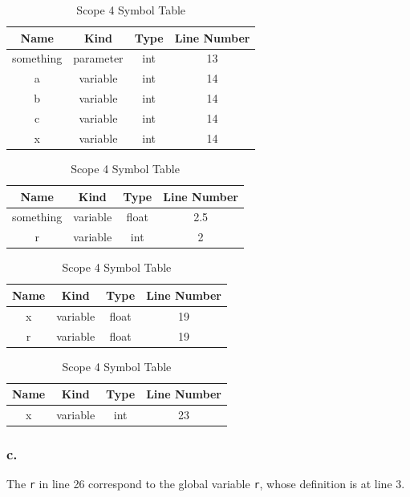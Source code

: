 \documentclass{article}
\def\code#1{\texttt{#1}}
\begin{document}
    \begin{table}[h!]
		\begin{center}
			\caption{Scope 1 Symbol Table}
			\label{tab:table1}
			\begin{tabular}{ |c|c|c|c|} 
			\toprule
			Name & Kind & Type & Line Number  \\ 
			\midrule
			something & parameter & int & 13  \\ 

			a & variable & int & 14  \\ 

			b & variable & int & 14  \\ 

			c & variable & int & 14  \\ 

			x & variable & int & 14  \\ 
			\bottomrule
			\end{tabular}
		
			\caption{Scope 2 Symbol Table}
			\label{tab:table 2}
			\begin{tabular}{ |c|c|c|c|} 
				\toprule
				Name & Kind & Type & Line Number  \\ 
				\midrule
				something & variable & float & 2.5 \\ 
				r & variable & int & 2  \\ 
				\bottomrule
			\end{tabular}
		
			\caption{Scope 3 Symbol Table}
			\label{tab:table 3}
			\begin{tabular}{ |c|c|c|c|} 
				\toprule
				Name & Kind & Type & Line Number  \\ 
				\midrule
				x & variable & float & 19  \\ 
				r & variable & float & 19  \\ 
				\bottomrule
			\end{tabular}
		
	
		\caption{Scope 4 Symbol Table}
		\label{tab:table 4}
		\begin{tabular}{ |c|c|c|c|} 
			\toprule
			Name & Kind & Type & Line Number  \\ 
			\midrule
			x & variable & int & 23  \\ 
			\bottomrule
		\end{tabular}
	\end{center}
	\end{table}


	\subsubsection*{c.}
	The \code{r} in line 26 correspond to the global variable \code{r}, whose definition is at line 3.\\
	
\end{document}

